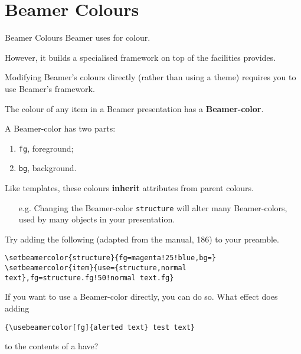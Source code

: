 
\section{Beamer Colours}\label{sec:colours}


\begin{frame}{Beamer Colours}
  Beamer uses  for colour.

  However, it builds a specialised framework on top of the facilities  provides.

  Modifying Beamer's colours directly (rather than using a theme) requires you to use Beamer's framework.

  The colour of any item in a Beamer presentation has a \alert<2>{\textbf{Beamer-color}}.

  A Beamer-color has two parts:
  \begin{enumerate}
    \item<3-| alert@3> \texttt{fg}, foreground;
    \item<3-| alert@4> \texttt{bg}, background.
  \end{enumerate}

  Like templates, these colours \alert<5>{\textbf{inherit}} attributes from parent colours.
  \begin{itemize}
    \item[e.g.] Changing the Beamer-color \texttt{structure} will alter many Beamer-colors, used by many objects in your presentation.
  \end{itemize}

\end{frame}

\begin{exercise}
Try adding the following (adapted from the manual, 186) to your preamble.
\begin{verbatim}
\setbeamercolor{structure}{fg=magenta!25!blue,bg=}
\setbeamercolor{item}{use={structure,normal text},fg=structure.fg!50!normal text.fg}
\end{verbatim}
If you want to use a Beamer-color directly, you can do so. What effect does adding
\begin{verbatim}
{\usebeamercolor[fg]{alerted text} test text}
\end{verbatim}
to the contents of a  have?
\end{exercise}



